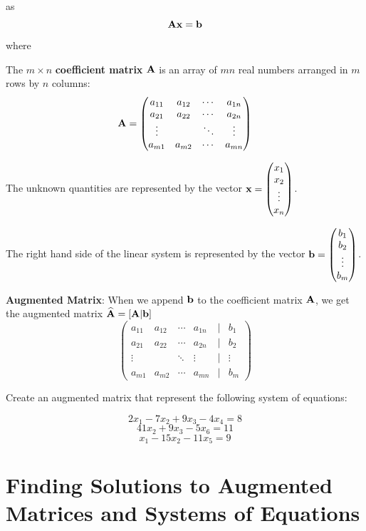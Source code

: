 \documentclass[]{book}
\theoremstyle{definition}
\theoremstyle{definition}
\theoremstyle{definition}
\theoremstyle{remark}
\let\BeginKnitrBlock\begin \let\EndKnitrBlock\end
\begin{document}
as \[{\bf A x = b}\] where

The \(m \times n\) \textbf{coefficient matrix} \({\bf A}\) is an array
of \(m n\) real numbers arranged in \(m\) rows by \(n\) columns:
\[{\bf A}=\begin{pmatrix}
            a_{11} & a_{12} & \cdots & a_{1n} \\
            a_{21} & a_{22} & \cdots & a_{2n} \\
            \vdots &  & \ddots & \vdots \\
            a_{m1} & a_{m2} & \cdots & a_{mn}
            \end{pmatrix}\]

The unknown quantities are represented by the vector
\({\bf x}=\begin{pmatrix} x_1\\x_2\\\vdots\\x_n \end{pmatrix}\).

The right hand side of the linear system is represented by the vector
\({\bf b}=\begin{pmatrix} b_1\\b_2\\\vdots\\b_m \end{pmatrix}\).

\textbf{Augmented Matrix}: When we append \(\bf b\) to the coefficient
matrix \(\bf A\), we get the augmented matrix
\(\widehat{\bf A}=[\bf A | b]\) \[\begin{pmatrix}
            a_{11} & a_{12} & \cdots & a_{1n} & | & b_1\\
            a_{21} & a_{22} & \cdots & a_{2n} & | & b_2\\
            \vdots &  & \ddots & \vdots & | & \vdots\\
            a_{m1} & a_{m2} & \cdots & a_{mn} & | & b_m
            \end{pmatrix}\]

\BeginKnitrBlock{exercise}[Augmented Matrix]
\protect\hypertarget{exr:augmatrix}{}{\label{exr:augmatrix}
{} }

Create an augmented matrix that represent the following system of
equations:

\[2x_1 -7x_2 + 9x_3 -4x_4 = 8\] \[41x_2 + 9x_3 -5x_6 = 11\]
\[x_1 -15x_2 -11x_5 = 9\]
\EndKnitrBlock{exercise}

\section{Finding Solutions to Augmented Matrices and Systems of
Equations}\label{finding-solutions-to-augmented-matrices-and-systems-of-equations}
\end{document}
